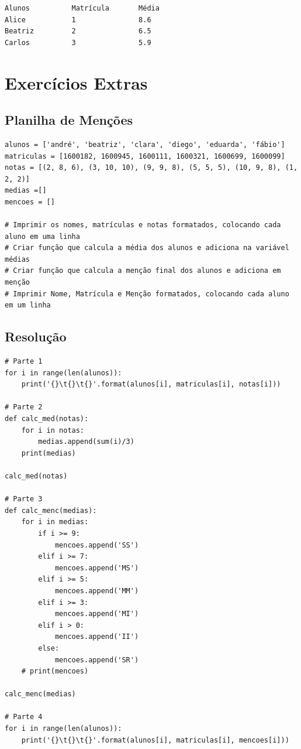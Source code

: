 \documentclass[presentation]{beamer}
\begin{document}
\begin{verbatim}
Alunos          Matrícula       Média
Alice           1               8.6
Beatriz         2               6.5
Carlos          3               5.9
\end{verbatim}

\section{Exercícios Extras}
\label{sec:orgheadline95}
\subsection{Planilha de Menções}
\label{sec:orgheadline91}
\begin{verbatim}
alunos = ['andré', 'beatriz', 'clara', 'diego', 'eduarda', 'fábio']
matriculas = [1600182, 1600945, 1600111, 1600321, 1600699, 1600099]
notas = [(2, 8, 6), (3, 10, 10), (9, 9, 8), (5, 5, 5), (10, 9, 8), (1, 2, 2)]
medias =[]
mencoes = []

# Imprimir os nomes, matrículas e notas formatados, colocando cada aluno em uma linha
# Criar função que calcula a média dos alunos e adiciona na variável médias
# Criar função que calcula a menção final dos alunos e adiciona em menção
# Imprimir Nome, Matrícula e Menção formatados, colocando cada aluno em um linha
\end{verbatim}

\subsection{Resolução}
\label{sec:orgheadline92}
\begin{verbatim}
# Parte 1
for i in range(len(alunos)):
    print('{}\t{}\t{}'.format(alunos[i], matriculas[i], notas[i]))

# Parte 2
def calc_med(notas):
    for i in notas:
        medias.append(sum(i)/3)
    print(medias)

calc_med(notas)

# Parte 3
def calc_menc(medias):
    for i in medias:
        if i >= 9:
            mencoes.append('SS')
        elif i >= 7:
            mencoes.append('MS')
        elif i >= 5:
            mencoes.append('MM')
        elif i >= 3:
            mencoes.append('MI')
        elif i > 0:
            mencoes.append('II')
        else: 
            mencoes.append('SR')
    # print(mencoes)

calc_menc(medias)

# Parte 4
for i in range(len(alunos)):
    print('{}\t{}\t{}'.format(alunos[i], matriculas[i], mencoes[i]))
\end{verbatim}
\end{document}
